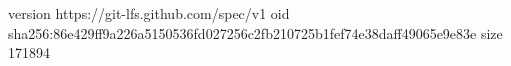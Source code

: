 version https://git-lfs.github.com/spec/v1
oid sha256:86e429ff9a226a5150536fd027256c2fb210725b1fef74e38daff49065e9e83e
size 171894
